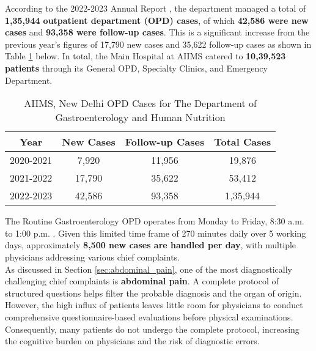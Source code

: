\noindent According to the 2022-2023 Annual Report \cite{AIIMS2024}, the department managed a total of \textcolor{TUMRed}{\textbf{1,35,944 outpatient department (OPD) cases}}, of which \textcolor{TUMRed}{\textbf{42,586 were new cases}} and \textcolor{TUMRed}{\textbf{93,358 were follow-up cases}}. This is a significant increase from the previous year's figures of 17,790 new cases and 35,622 follow-up cases as shown in Table \ref{tab:aiims_opd} below. In total, the Main Hospital at AIIMS catered to \textcolor{TUMRed}{\textbf{10,39,523 patients}} through its General OPD, Specialty Clinics, and Emergency Department.

\begin{table}[h]
    \centering
    \begin{tabular}{|c|c|c|c|}
        \hline
        \textbf{Year} & \textbf{New Cases} & \textbf{Follow-up Cases} & \textbf{Total Cases} \\
        \hline
        2020-2021 & 7,920 & 11,956 & 19,876 \\
        2021-2022 & 17,790 & 35,622 & 53,412 \\
        2022-2023 & 42,586 & 93,358 & 1,35,944 \\
        \hline
    \end{tabular}
    \caption{AIIMS, New Delhi OPD Cases for The Department of Gastroenterology and Human Nutrition}
    \label{tab:aiims_opd}
\end{table}

\noindent The Routine Gastroenterology OPD operates from Monday to Friday, 8:30 a.m. to 1:00 p.m. \cite{AIIMSOPD}. Given this limited time frame of 270 minutes daily over 5 working days, approximately \textcolor{TUMRed}{\textbf{8,500 new cases are handled per day}}, with multiple physicians addressing various chief complaints.\\[\baselineskip]

\noindent As discussed in Section \ref{sec:abdominal_pain}, one of the most diagnostically challenging chief complaints is \textcolor{TUMRed}{\textbf{abdominal pain}}. A complete protocol of structured questions helps filter the probable diagnosis and the organ of origin. However, the high influx of patients leaves little room for physicians to conduct comprehensive questionnaire-based evaluations before physical examinations. Consequently, many patients do not undergo the complete protocol, increasing the cognitive burden on physicians and the risk of diagnostic errors.\\[\baselineskip]

